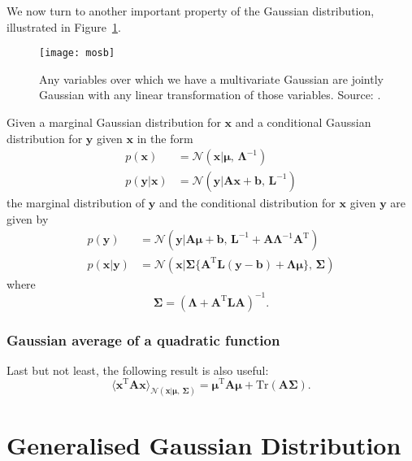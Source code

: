 We now turn to another important property of the Gaussian distribution, illustrated in Figure~\ref{fig:mosb}.
\begin{figure}
\centering
\texttt{[image: mosb]}
\caption{Any variables over which we have a multivariate Gaussian are jointly Gaussian with any linear transformation of those variables. Source: \citep{mosb}.}
\label{fig:mosb}
\end{figure}
Given a marginal Gaussian distribution for $\mathbf{x}$ and a conditional Gaussian distribution for $\mathbf{y}$ given $\mathbf{x}$ in the form
\begin{align}
	p(\mathbf{x}) &= \mathcal{N}(\mathbf{x}|\boldsymbol{\mu},\, \boldsymbol{\Lambda}^{-1})
	\\
	p(\mathbf{y}|\mathbf{x}) &= \mathcal{N}(\mathbf{y}|\mathbf{A}\mathbf{x} + \mathbf{b},\, \mathbf{L}^{-1})
\end{align}
the marginal distribution of $\mathbf{y}$ and the conditional distribution for $\mathbf{x}$ given $\mathbf{y}$ are given by
\begin{align}
	p(\mathbf{y}) &= \mathcal{N}(\mathbf{y}|\mathbf{A}\boldsymbol{\mu} + \mathbf{b},\, \mathbf{L}^{-1} + \mathbf{A}\boldsymbol{\Lambda}^{-1}\mathbf{A}^\text{T})
	\\
	p(\mathbf{x}|\mathbf{y}) &= \mathcal{N}(\mathbf{x}|\boldsymbol{\Sigma}\{\mathbf{A}^\text{T}\mathbf{L}(\mathbf{y} - \mathbf{b}) + \boldsymbol{\Lambda}\boldsymbol{\mu}\},\, \boldsymbol{\Sigma})
\end{align} 
where
\begin{equation}
	\boldsymbol{\Sigma} = (\boldsymbol{\Lambda} + \mathbf{A}^\text{T}\mathbf{L}\mathbf{A})^{-1}.
\end{equation}

\subsubsection{Gaussian average of a quadratic function}

Last but not least, the following result is also useful:
\begin{equation}
\label{eq:gaussian-avg-of-quadratic-fct}
	\langle\mathbf{x}^\text{T}\mathbf{A}\mathbf{x}\rangle_{\mathcal{N}(\mathbf{x}|\boldsymbol{\mu},\, \boldsymbol{\Sigma})}
	= \boldsymbol{\mu}^\text{T}\mathbf{A}\boldsymbol{\mu}
	+ \mathrm{Tr}(\mathbf{A}\boldsymbol{\Sigma}).
\end{equation}

\section{Generalised Gaussian Distribution}
\label{sec:generalised-gaussian-distribution}

